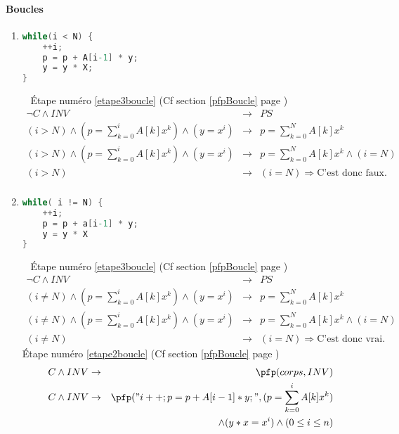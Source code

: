 \paragraph{Boucles} 
	\begin{enumerate} 
		\item \begin{lstlisting}[language=C,numbers=none]
while(i < N) { 
	++i; 
	p = p + A[i-1] * y; 
	y = y * X; 
}
		\end{lstlisting}~
		\'Etape numéro \ref{etape3boucle} (Cf section \ref{pfpBoucle} page \pageref{etape3boucle})
		\begin{eqnarray*}
			\neg C \wedge INV &\rightarrow& PS\\
			(i > N) \wedge (p = \sum^i_{k=0} A[k] x^k) \wedge(y=x^i) &\rightarrow& p = \sum^N_{k=0}A[k]x^k\\
			(i > N) \wedge (p = \sum^i_{k=0} A[k] x^k) \wedge(y=x^i) &\rightarrow& p = \sum^N_{k=0}A[k]x^k\wedge (i=N)\\
			(i > N) &\rightarrow& (i = N) \Rightarrow \textrm{C'est donc faux.}\\
		\end{eqnarray*}
		\item \begin{lstlisting}[language=C,numbers=none]
while( i != N) { 
	++i; 
	p = p + a[i-1] * y; 
	y = y * X 
} 
\end{lstlisting}~
		\'Etape numéro \ref{etape3boucle} (Cf section \ref{pfpBoucle} page \pageref{etape3boucle})
		\begin{eqnarray*}
			\neg C \wedge INV &\rightarrow& PS\\
			(i \neq N) \wedge (p = \sum^i_{k=0} A[k] x^k) \wedge(y=x^i) &\rightarrow& p = \sum^N_{k=0}A[k]x^k\\
			(i \neq N) \wedge (p = \sum^i_{k=0} A[k] x^k) \wedge(y=x^i) &\rightarrow& p = \sum^N_{k=0}A[k]x^k\wedge (i=N)\\
			(i \neq N) &\rightarrow& (i = N) \Rightarrow \textrm{C'est donc vrai}. 
		\end{eqnarray*}
		\'Etape numéro \ref{etape2boucle} (Cf section \ref{pfpBoucle} page \pageref{etape3boucle})
		\begin{eqnarray*}
			C \wedge INV &\rightarrow& \pfp(corps, INV)\\
			C \wedge INV &\rightarrow& \pfp ("i++;p=p+A[i-1]*y;", (p=\sum^i_{k=0}A[k]x^k)\\&&\wedge(y*x=x^i)\wedge(0\leq i\leq n )\\

\end{eqnarray*}
\end{enumerate}
